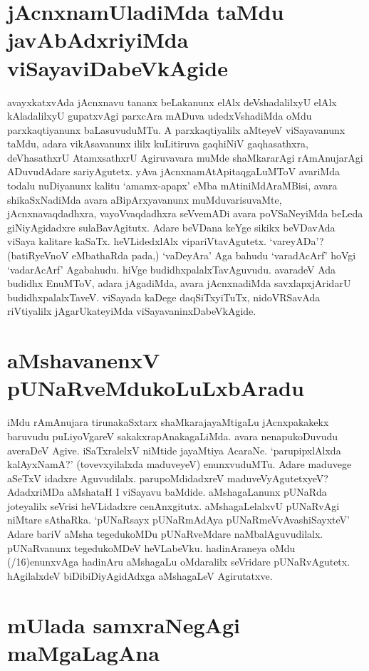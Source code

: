 \section*{jAcnxnamUladiMda taMdu javAbAdxriyiMda viSayaviDabeVkAgide}

avayxkatxvAda jAcnxnavu tananx beLakanunx elAlx deVshadalilxyU elAlx kAladalilxyU gupatxvAgi parxcAra mADuva udedxVshadiMda oMdu parxkaqtiyanunx baLasuvuduMTu. A parxkaqtiyalilx aMteyeV viSayavanunx taMdu, adara vikAsavanunx ililx kuLitiruva gaqhiNiV gaqhasathxra, deVhasathxrU AtamxsathxrU Agiruvavara muMde shaMkararAgi rAmAnujarAgi ADuvudAdare sariyAgutetx. yAva jAcnxnamAtApitaqgaLuMToV avariMda todalu nuDiyanunx kalitu `amamx-apapx' eMba mAtiniMdAraMBisi, avara shikaSxNadiMda avara aBipArxyavanunx muMduvarisuvaMte, jAcnxnavaqdadhxra, vayoVvaqdadhxra seVvemADi avara poVSaNeyiMda beLeda giNiyAgidadxre sulaBavAgitutx. Adare beVDana keYge sikikx beVDavAda viSaya kalitare kaSaTx. heVLidedxlAlx vipariVtavAgutetx. `vareyADa'? (batiRyeVnoV eMbathaRda pada,) `vaDeyAra' Aga bahudu `varadAcArf' hoVgi `vadarAcArf' Agabahudu. hiVge budidhxpalalxTavAguvudu. avaradeV Ada budidhx EnuMToV, adara jAgadiMda, avara jAcnxnadiMda savxlapxjAridarU budidhxpalalxTaveV. viSayada kaDege daqSiTxyiTuTx, nidoVRSavAda riVtiyalilx jAgarUkateyiMda viSayavaninxDabeVkAgide.

\section*{aMshavanenxV pUNaRveMdukoLuLxbAradu}

iMdu rAmAnujara tirunakaSxtarx shaMkarajayaMtigaLu jAcnxpakakekx baruvudu puLiyoVgareV sakakxrapAnakagaLiMda. avara nenapukoDuvudu averaDeV Agive. iSaTxralelxV niMtide jayaMtiya AcaraNe. `parupipxlAlxda kalAyxNamA?' (tovevxyilalxda maduveyeV) enunxvuduMTu. Adare maduvege aSeTxV idadxre Aguvudilalx. parupoMdidadxreV maduveVyAgutetxyeV? AdadxriMDa aMshataH I viSayavu baMdide. aMshagaLanunx  pUNaRda joteyalilx seVrisi heVLidadxre cenAnxgitutx. aMshagaLelalxvU pUNaRvAgi niMtare sAthaRka. `pUNaRsayx pUNaRmAdAya\label{48a} pUNaRmeVvAvashiSayxteV' Adare bariV aMsha tegedukoMDu pUNaRveMdare naMbalAguvudilalx. pUNaRvanunx tegedukoMDeV heVLabeVku. hadinAraneya oMdu {(/16)}enunxvAga hadinAru aMshagaLu oMdaralilx seVridare pUNaRvAgutetx. hAgilalxdeV biDibiDiyAgidAdxga aMshagaLeV Agirutatxve.

\section*{mUlada samxraNegAgi maMgaLagAna}

